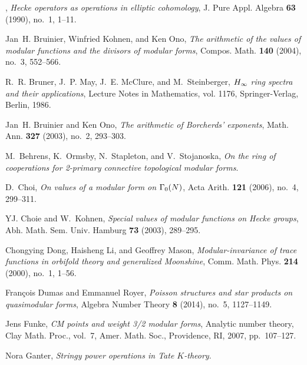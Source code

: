 \documentclass{gtpart}
\theoremstyle{definition}
\theoremstyle{remark}
\renewcommand{\=}{\approx}
\renewcommand{\-}{\sim}
\numberwithin{equation}{section}
\numberwithin{thm}{section}
\begin{document}
\begin{thebibliography}
\bysame, \emph{Hecke operators as operations in elliptic cohomology}, J. Pure
  Appl. Algebra \textbf{63} (1990), no.~1, 1--11. 

Jan~H. Bruinier, Winfried Kohnen, and Ken Ono, \emph{The arithmetic of the
  values of modular functions and the divisors of modular forms}, Compos. Math.
  \textbf{140} (2004), no.~3, 552--566. 

R.~R. Bruner, J.~P. May, J.~E. McClure, and M.~Steinberger, \emph{{$H\sb \infty
  $} ring spectra and their applications}, Lecture Notes in Mathematics, vol.
  1176, Springer-Verlag, Berlin, 1986. 

Jan~H. Bruinier and Ken Ono, \emph{The arithmetic of {B}orcherds' exponents},
  Math. Ann. \textbf{327} (2003), no.~2, 293--303. 

M.~Behrens, K.~Ormsby, N.~Stapleton, and V.~Stojanoska, \emph{On the ring of
  cooperations for 2-primary connective topological modular forms}. 

D.~Choi, \emph{On values of a modular form on {$\Gamma\sb 0(N)$}}, Acta Arith.
  \textbf{121} (2006), no.~4, 299--311. 

YJ. Choie and W.~Kohnen, \emph{Special values of modular functions on {H}ecke
  groups}, Abh. Math. Sem. Univ. Hamburg \textbf{73} (2003), 289--295.

Chongying Dong, Haisheng Li, and Geoffrey Mason, \emph{Modular-invariance of
  trace functions in orbifold theory and generalized {M}oonshine}, Comm. Math.
  Phys. \textbf{214} (2000), no.~1, 1--56. 

Fran{\c{c}}ois Dumas and Emmanuel Royer, \emph{Poisson structures and star
  products on quasimodular forms}, Algebra Number Theory \textbf{8} (2014),
  no.~5, 1127--1149. \linebreak {}

Jens Funke, \emph{C{M} points and weight 3/2 modular forms}, Analytic number
  theory, Clay Math. Proc., vol.~7, Amer. Math. Soc., Providence, RI, 2007,
  pp.~107--127. 

Nora Ganter, \emph{Stringy power operations in {T}ate {$K$}-theory}. 


\end{thebibliography}
\end{document}
